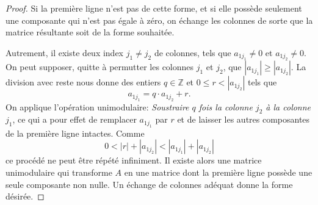 \begin{proof}

    Si la première ligne n'est pas de cette forme, et si elle possède seulement une
  composante qui n'est pas égale à zéro, on échange les colonnes de sorte que
  la matrice résultante soit de la forme souhaitée.
  
  Autrement, il existe deux index $j_1\neq j_2$ de colonnes, tels
  que $a_{1j_1}\neq 0$ et $a_{1j_2} \neq 0$. On peut supposer, quitte à permutter les colonnes $j_1$ et $j_2$, que
  $|a_{1j_1}| ≥ |a_{1j_2}|$. La division avec reste nous donne des entiers $q ∈ℤ$ et
  $0 ≤r < |a_{1j_2}|$ tels que
  \begin{displaymath}
    a_{1j_1} = q ⋅ a_{1j_2} + r. 
  \end{displaymath}
  On applique l'opération unimodulaire: \emph{Soustraire $q$ fois la
    colonne $j_2$ à la colonne $j_1$}, ce qui a pour effet de remplacer $a_{1j_1}$ par $r$ et
   de laisser les autres composantes de la première ligne intactes. Comme
    \begin{displaymath}
      0 < |r|+ |a_{1j_2}|<  |a_{1j_{1}}|+ |a_{1j_2}|
    \end{displaymath}
    ce procédé ne peut être répété infiniment. Il existe alors une
    matrice unimodulaire qui transforme $A$ en une matrice dont la première
    ligne possède une seule composante non nulle. Un échange de
    colonnes adéquat donne la forme désirée.
  \end{proof}


